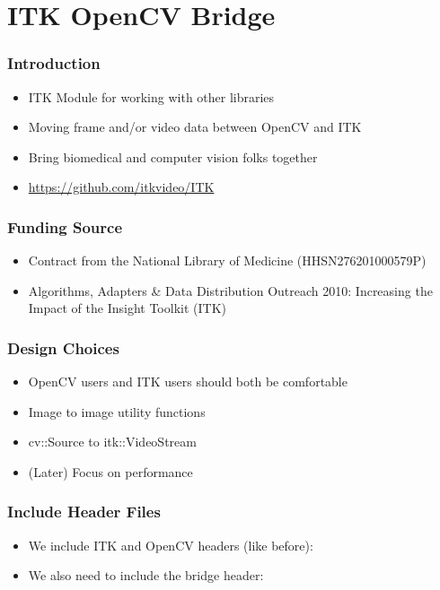 \section{ITK OpenCV Bridge}



\begin{frame}
\frametitle{Introduction}
\begin{itemize}
\item ITK Module for working with other libraries
\item Moving frame and/or video data between OpenCV and ITK
\item Bring biomedical and computer vision folks together
\item \url{https://github.com/itkvideo/ITK}
\end{itemize}
\end{frame}

\begin{frame}
\frametitle{Funding Source}
\begin{itemize}
\item Contract from the National Library of Medicine (HHSN276201000579P)
\item Algorithms, Adapters \& Data Distribution Outreach 2010:
  Increasing the Impact of the Insight Toolkit (ITK)
\end{itemize}
\end{frame}

\begin{frame}
\frametitle{Design Choices}
\begin{itemize}
\item OpenCV users and ITK users should both be comfortable
\item Image to image utility functions
\item cv::Source to itk::VideoStream
\item (Later) Focus on performance
\end{itemize}
\end{frame}



\begin{frame}
\frametitle{Include Header Files}
\begin{itemize}
\item We include ITK and OpenCV headers (like before):


\item We also need to include the bridge header:

\end{itemize}
\end{frame}

